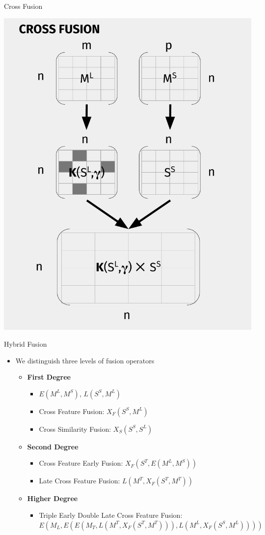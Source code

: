 \documentclass[10pt,xcolor=table]{beamer}
\newcommand\mlex{M^{\scriptscriptstyle L}}
\newcommand\msyn{M^{\scriptscriptstyle S}}
\newcommand\ssyn{S^{\scriptscriptstyle S}}
\begin{document}
\begin{frame}{Cross Fusion}
\begin{center}
\includegraphics[width=.55\linewidth]{image2/Chapitre3/xf_diag.pdf}
\end{center}
\end{frame}


\begin{frame}{Hybrid Fusion}
\begin{itemize}
\item \large We distinguish three levels of fusion operators
	\begin{itemize}
	\item \textbf{First Degree}
		\begin{itemize}
		\item $E(\mlex,\msyn)$, $L(\ssyn,\mlex)$ 
		\item Cross Feature Fusion: $X_F(S^S, M^L)$
		\item Cross Similarity Fusion: $X_S(S^S, S^L)$
		\end{itemize}
	\item \textbf{Second Degree}
		\begin{itemize}
		\item Cross Feature Early Fusion: $X_F(S^T , E(M^L , M^S ))$
		\item Late Cross Feature Fusion: $L(M^T, X_F (S^T , M^T ))$
		
		
		\end{itemize}
	\item \textbf{Higher Degree}
		\begin{itemize}
		\item Triple Early Double Late Cross Feature Fusion: $E(M_L , E(E(M_T , L(M^T , X_F (S^T , M^T ))) , L(M^L , X_F (S^S , M^L))))$
		\end{itemize}
	\end{itemize}

	

\end{itemize}

\end{frame}
\end{document}
